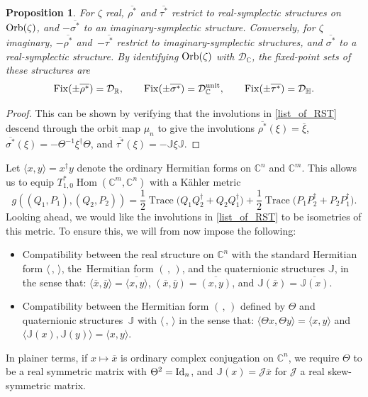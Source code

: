 \documentclass[pdftex]{sigma}
\numberwithin{equation}{section}
\newtheorem{Proposition}[Theorem]{Proposition}
 { \theoremstyle{definition}
\newtheorem{Definition}[Theorem]{Definition}
\newtheorem{Note}[Theorem]{Note}
\newtheorem{Example}[Theorem]{Example}
\newtheorem{Remark}[Theorem]{Remark} }
\DeclareMathOperator{\fix}{Fix}
\DeclareMathOperator{\Hom}{Hom}
\DeclareMathOperator{\Tr}{Trace}
\newcommand{\R}{\mathbb{R}}
\newcommand{\C}{\mathbb{C}}
\newcommand{\D}{\mathcal{D}}
\newcommand{\Q}{\mathbb{H}}
\newcommand{\Id}{{\rm Id}}
\begin{document}
\begin{Proposition}\label{RST}
	For $\zeta$ real, $\overline{\rho^*}$ and $\overline{\tau^*}$ restrict to real-symplectic structures on ${\rm Orb}(\zeta)$, and $-\overline{\sigma^*}$ to an imaginary-symplectic structure. Conversely, for $\zeta$ imaginary, $-\overline{\rho^*}$ and~$-\overline{\tau^*}$ restrict to imaginary-symplectic structures, and $\overline{\sigma^*}$ to a real-symplectic structure. By identifying ${\rm Orb}(\zeta)$ with $\D_{\C}$, the fixed-point sets of these structures are
	\begin{equation*}
		\fix(\pm\overline{\rho^*})=\D_\R,\qquad\fix(\pm\overline{\sigma^*})=\D_{\C}^{\rm unit},\qquad\fix(\pm\overline{\tau^*})=\D_\Q.
	\end{equation*}
\end{Proposition}
\begin{proof}
	This can be shown by verifying that the involutions in \eqref{list_of_RST} descend through the orbit map $\mu_n$ to give the involutions $\overline{\rho^*}(\xi)=\overline{\xi}$, $\overline{\sigma^*}(\xi)=-\Theta^{-1}\xi^\dagger\Theta$, and $\overline{\tau^*}(\xi)=-\mathbb{J}\xi\mathbb{J}$.
\end{proof}

\begin{Remark}%
	Let $\langle x,y\rangle=x^\dagger y$ denote the ordinary Hermitian forms on $\C^n$ and $\C^m$. This allows us to equip $T^*_{1,0}\Hom(\C^m,\C^n)$ with a K\"{a}hler metric
	\begin{equation}\label{metric}
		g((Q_1,P_1),(Q_2,P_2))=\frac{1}{2}\Tr\bigl(Q_1Q_2^\dagger+Q_2Q_1^\dagger\bigr)+\frac{1}{2}\Tr\bigl(P_1P_2^\dagger+P_2P_1^\dagger\bigr).
	\end{equation}
	Looking ahead, we would like the involutions in \eqref{list_of_RST} to be isometries of this metric. To ensure this, we will from now impose the following:
	\begin{itemize}\itemsep=0pt
		\item Compatibility between the real structure on $\C^n$ with the standard Hermitian form $\langle \,,\,\rangle$, the~Hermitian form $(\,,\,)$, and the quaternionic structures $\mathbb{J}$, in the sense that: $\langle\overline{x},\overline{y}\rangle=\overline{\langle x, y\rangle}$, $(\overline{x},\overline{y})=\overline{(x,y)}$, and $\mathbb{J}(\overline{x})=\overline{\mathbb{J}(x)}$.
		\item Compatibility between the Hermitian form $(\,,\,)$ defined by $\Theta$ and quaternionic structures~$\mathbb{J}$ with $\langle\,,\,\rangle$ in the sense that: $\langle \Theta x,\Theta y\rangle=\langle x,y\rangle$ and $\langle\mathbb{J}(x),\mathbb{J}(y)\rangle=\langle x,y\rangle$.
	\end{itemize}
	In plainer terms, if $x\mapsto\overline{x}$ is ordinary complex conjugation on $\C^n$, we require $\Theta$ to be a real symmetric matrix with $\Theta^2=\Id_n$, and $\mathbb{J}(x)=\mathcal{J}\overline{x}$ for $\mathcal{J}$ a real skew-symmetric matrix.
\end{Remark}
\end{document}
